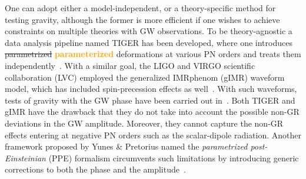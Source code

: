 \documentclass[prd,twocolumn,nofootinbib]{revtex4-1}
\newcommand{\zack}[1]{\textcolor{orange}{\textbf{#1}} }
\begin{document}




One can adopt either a model-independent, or a theory-specific method for testing gravity, although the former is more efficient if one wishes to achieve constraints on multiple theories with GW observations. To be theory-agnostic a data analysis pipeline named TIGER has been developed, where one introduces \sout{parametrized} \zack{parameterized} deformations at various PN orders and treats them independently~\cite{Agathos:2013upa,Meidam:2014jpa}. With a similar goal, the LIGO and VIRGO scientific collaboration (LVC) employed the generalized IMRphenom (gIMR) waveform model, which has included spin-precession effects as well~\cite{Monitor:2017mdv,Abbott:2016izl}. With such waveforms, tests of gravity with the GW phase have been carried out in~\cite{Monitor:2017mdv,TheLIGOScientific:2016pea,Yunes:2016jcc,Abbott:2017vtc,LIGOScientific:2019fpa,TheLIGOScientific:2016src}. Both TIGER and gIMR have the drawback that they do not take into account the possible non-GR deviations in the GW amplitude. Moreover, they cannot capture the non-GR effects entering at negative PN orders such as the scalar-dipole radiation. Another framework proposed by Yunes \& Pretorius named the \emph{parametrized post-Einsteinian} (PPE) formalism circumvents such limitations by introducing generic corrections to both the phase and the amplitude~\cite{Yunes:2009ke,Chatziioannou:2012rf}.
\end{document}
